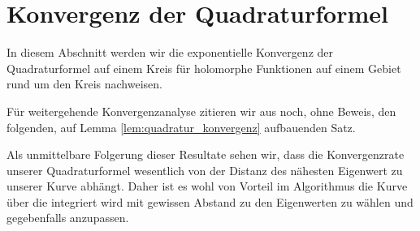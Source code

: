 \section{Konvergenz der Quadraturformel}

In diesem Abschnitt werden wir die exponentielle Konvergenz der Quadraturformel auf einem Kreis für holomorphe Funktionen auf einem Gebiet rund um den Kreis nachweisen.




Für weitergehende Konvergenzanalyse zitieren wir aus \cite{EWPs} noch, ohne Beweis, den folgenden, auf Lemma \ref{lem:quadratur_konvergenz} aufbauenden Satz.



Als unmittelbare Folgerung dieser Resultate sehen wir, dass die Konvergenzrate unserer Quadraturformel wesentlich von der Distanz des nähesten Eigenwert zu unserer Kurve abhängt.
Daher ist es wohl von Vorteil im Algorithmus die Kurve über die integriert wird mit gewissen Abstand zu den Eigenwerten zu wählen und gegebenfalls anzupassen.
